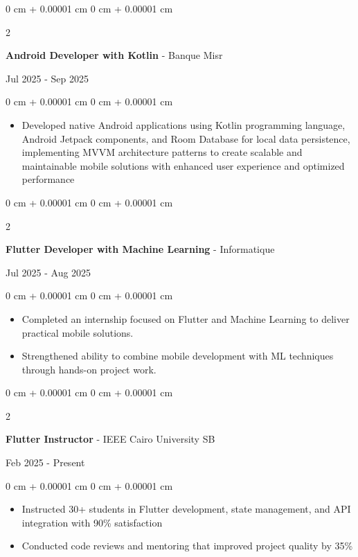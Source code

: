 \documentclass[10pt, letterpaper]{article}
\newenvironment{highlights}{
\begin{itemize}[
topsep=0.10 cm,
parsep=0.10 cm,
partopsep=0pt,
itemsep=0pt,
leftmargin=0 cm + 10pt
]
}{
\end{itemize}
} %
\newenvironment{onecolentry}{
\begin{adjustwidth}{
0 cm + 0.00001 cm
}{
0 cm + 0.00001 cm
}
}{
\end{adjustwidth}
} %
\newenvironment{twocolentry}[2][]{
\onecolentry
\def\secondColumn{#2}
\setcolumnwidth{\fill, 4.5 cm}
\begin{paracol}{2}
}{
\switchcolumn \raggedleft \secondColumn
\end{paracol}
\endonecolentry
} %
\begin{document}
\vspace{0.1cm}

\begin{twocolentry}{
Jul 2025 - Sep 2025
}
\textbf{\large Android Developer with Kotlin} - Banque Misr
\end{twocolentry}
\vspace{0.1cm}
\begin{onecolentry}
\begin{highlights}
\item Developed native Android applications using Kotlin programming language, Android Jetpack components, and Room Database for local data persistence, implementing MVVM architecture patterns to create scalable and maintainable mobile solutions with enhanced user experience and optimized performance
\end{highlights}
\end{onecolentry}
\vspace{0.2 cm}
\begin{twocolentry}{
Jul 2025 - Aug 2025
}
\textbf{\large Flutter Developer with Machine Learning} - Informatique
\end{twocolentry}
\vspace{0.1 cm}
\begin{onecolentry}
\begin{highlights}
\item Completed an internship focused on Flutter and Machine Learning to deliver practical mobile solutions.
\item Strengthened ability to combine mobile development with ML techniques through hands-on project work.
\end{highlights}
\end{onecolentry}
\vspace{0.2 cm}
\begin{twocolentry}{
Feb 2025 - Present
}
\textbf{\large Flutter Instructor} - IEEE Cairo University SB
\end{twocolentry}
\vspace{0.1 cm}
\begin{onecolentry}
\begin{highlights}
\item Instructed 30+ students in Flutter development, state management, and API integration with 90\% satisfaction
\item Conducted code reviews and mentoring that improved project quality by 35\%
\end{highlights}
\end{onecolentry}
\vspace{0.2 cm}
\end{document}
